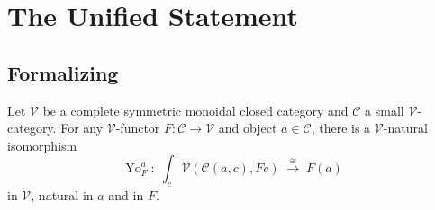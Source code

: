 \section{The Unified Statement}
\label{sec:unified-yoneda}

\subsection{Formalizing}

\begin{theorem}
\label{thm:yoneda-unified}
Let $\mathcal{V}$ be a complete symmetric monoidal closed category and
$\mathcal{C}$ a small $\mathcal{V}$-category. For any $\mathcal{V}$-functor
$F : \mathcal{C} \to \mathcal{V}$ and object $a \in \mathcal{C}$, there is a
$\mathcal{V}$-natural isomorphism
\begin{equation*}
  \mathrm{Yo}_F^a \;:\; \int_c \mathcal{V}(\mathcal{C}(a, c), F c)
  \;\xrightarrow{\;\cong\;}\; F(a)
\end{equation*}
in $\mathcal{V}$, natural in $a$ and in $F$.
\end{theorem}

